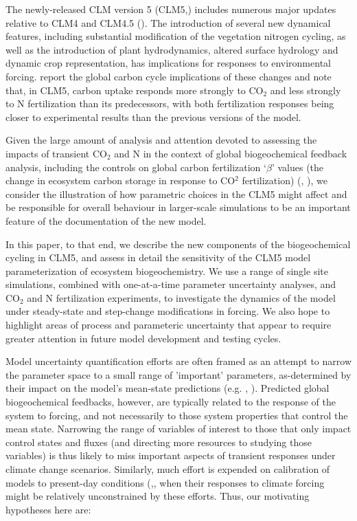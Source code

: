 \usepackage{}\documentclass[draft,linenumbers]{agujournal}
\begin{document}
The newly-released CLM version 5  (CLM5,\cite{lawrence2018}) includes numerous major updates relative to CLM4 and CLM4.5 (\cite{lawrence2011}). The introduction of several new dynamical features, including substantial modification of the vegetation nitrogen cycling, as well as the introduction of plant hydrodynamics, altered surface hydrology and dynamic crop representation, has implications for responses to environmental forcing. \cite{wieder2019} report the global carbon cycle implications of these changes and note that, in CLM5, carbon uptake responds more strongly to CO$_{2}$ and less strongly to N fertilization than its predecessors, with both fertilization responses being closer to experimental results than the previous versions of the model. 

Given the large amount of analysis and attention devoted to assessing the impacts of transient CO$_{2}$ and N in the context of global biogeochemical feedback analysis, including the controls on global carbon fertilization `$\beta$' values (the change in ecosystem carbon storage in response to CO$^{2}$ fertilization) (\cite{arora2013}, \cite{friedlingstein2014}), we consider the illustration of how parametric choices in the CLM5 might affect and be responsible for overall behaviour in larger-scale simulations to be an important feature of the documentation of the new model.

In this paper, to that end, we describe the new components of the biogeochemical cycling in CLM5, and assess in detail the sensitivity of the CLM5 model parameterization of ecosystem biogeochemistry. We use a range of single site simulations, combined with one-at-a-time parameter uncertainty analyses, and CO$_{2}$ and N fertilization experiments, to investigate the dynamics of the model under steady-state and step-change modifications in forcing. We also hope to highlight areas of process and parameteric uncertainty that appear to require greater attention in future model development and testing cycles.

Model uncertainty quantification efforts are often framed as an attempt to narrow the parameter space to a small range of 'important' parameters, as-determined by their impact on the model's mean-state predictions (e.g. \cite{dietze2014}, \cite{ricciuto2018}).  Predicted global biogeochemical feedbacks, however, are typically related to the response of the system to forcing, and not necessarily to those system properties that control the mean state. Narrowing the range of variables of interest to those that only impact control states and fluxes (and directing more resources to studying those variables) is thus likely to miss important aspects of transient responses under climate change scenarios.  Similarly, much effort is expended on calibration of models to present-day conditions (\cite{fer2018},\cite{lu2018}, when their responses to climate forcing might be relatively unconstrained by these efforts.  Thus, our motivating hypotheses here are:
\end{document}
